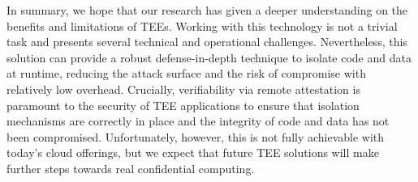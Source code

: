 In summary, we hope that our research has given a deeper understanding on the
benefits and limitations of \acp{TEE}. Working with this technology is not a
trivial task and presents several technical and operational challenges.
Nevertheless, this solution can provide a robust defense-in-depth technique to
isolate code and data at runtime, reducing the attack surface and the risk of
compromise with relatively low overhead. Crucially, verifiability via remote
attestation is paramount to the security of \ac{TEE} applications to ensure that
isolation mechanisms are correctly in place and the integrity of code and data
has not been compromised. Unfortunately, however, this is not fully achievable
with today's cloud offerings, but we expect that future \ac{TEE} solutions will
make further steps towards real confidential computing.